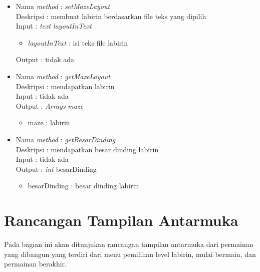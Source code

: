 \begin{enumerate}
		\begin{itemize}
			\item Nama \textit{method} : \textit{setMazeLayout}\\
				  Deskripsi : membuat labirin berdasarkan file teks yang dipilih\\
				  Input : \textit{text layoutInText }
				  	\begin{itemize}
				  		\item \textit{layoutInText} : isi teks file labirin
				  	\end{itemize}
				  Output : tidak ada\\
		\end{itemize}
		
		\begin{itemize}
			\item Nama \textit{method} : \textit{getMazeLayout}\\
				  Deskripsi : mendapatkan labirin \\
				  Input : tidak ada\\
				  Output : \textit{Arrays} \textit{maze}
				  	\begin{itemize}
				  		\item maze : labirin 
				  	\end{itemize}
		\end{itemize}
		
		\begin{itemize}
			\item Nama \textit{method} : \textit{getBesarDinding}\\
				  Deskripsi : mendapatkan besar dinding labirin \\
				  Input : tidak ada\\
				  Output : \textit{int} besarDinding
				  	\begin{itemize}
				  		\item besarDinding : besar dinding labirin
				  	\end{itemize}
		\end{itemize}
\end{enumerate} 

\section{Rancangan Tampilan Antarmuka}
Pada bagian ini akan ditunjukan rancangan tampilan antarmuka dari permainan yang dibangun yang terdiri dari menu pemilihan level labirin, mulai bermain, dan permainan berakhir.

